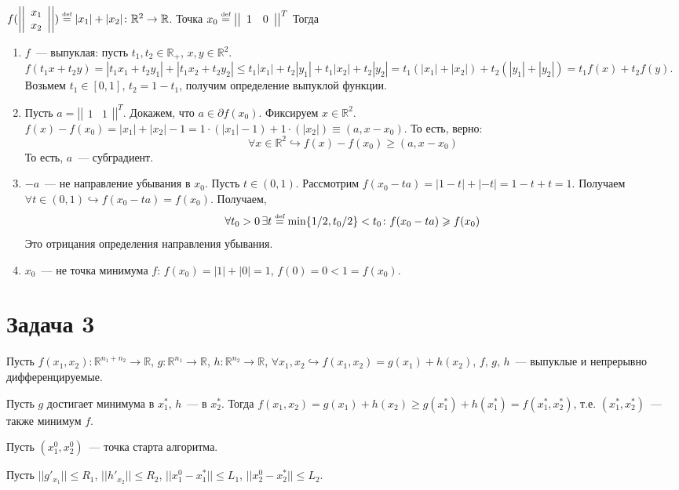 \documentclass[a4paper]{article}
\newcommand{\matrixr}{\right|\right|}
\newcommand{\matrixl}{\left|\left|}
\def\eqdef{\overset{\mbox{\tiny def}}{=}}
\begin{document}
$f(\matrixl
\begin{array}{c}
x_1\\
x_2
\end{array}
\matrixr)\eqdef |x_1|+|x_2|\colon \mathbb{R}^2\to\mathbb{R}$. Точка $x_0\eqdef \matrixl
\begin{array}{cc}
1 & 0
\end{array}
\matrixr^T$ Тогда\begin{enumerate}
\item $f$~--- выпуклая: пусть $t_1,t_2\in\mathbb{R}_+$, $x,y\in\mathbb{R}^2$. $f(t_1x+t_2y)=|t_1x_1+t_2y_1|+|t_1x_2+t_2y_2|\leqslant t_1|x_1|+t_2|y_1|+t_1|x_2|+t_2|y_2|=t_1(|x_1|+|x_2|)+t_2(|y_1|+|y_2|)=t_1f(x)+t_2f(y)$. Возьмем $t_1\in[0,1]$, $t_2=1-t_1$, получим определение выпуклой функции.
\item Пусть $a=\matrixl
\begin{array}{cc}
1 & 1
\end{array}
\matrixr^T$. Докажем, что $a\in\partial f(x_0)$. Фиксируем $x\in\mathbb{R}^2$. $f(x)-f(x_0)=|x_1|+|x_2|-1=1\cdot(|x_1|-1)+1\cdot(|x_2|)\equiv(a, x-x_0)$. То есть, верно:
$$\forall x\in\mathbb{R}^2\hookrightarrow f(x)-f(x_0)\geqslant (a,x-x_0)$$
То есть, $a$~--- субградиент.
\item $-a$~--- не направление убывания в $x_0$. Пусть $t\in(0,1)$. Рассмотрим $f(x_0-ta)=|1-t|+|-t|=1-t+t=1$. Получаем $\forall t\in(0,1)\hookrightarrow f(x_0-ta)=f(x_0)$. Получаем, $$\forall t_0>0\,\exists t\eqdef\min\{1/2,t_0/2\}<t_0\colon f(x_0-ta)\geqslant f(x_0)$$
Это отрицания определения направления убывания.
\item $x_0$~--- не точка минимума $f$: $f(x_0)=|1|+|0|=1$, $f(0)=0<1=f(x_0)$.
\end{enumerate}
\section*{Задача 3}
Пусть $f(x_1,x_2)\colon \mathbb{R}^{n_1+n_2}\to\mathbb{R}$, $g\colon \mathbb{R}^{n_1}\to\mathbb{R}$,  $h\colon \mathbb{R}^{n_2}\to\mathbb{R}$, $\forall x_1,x_2\hookrightarrow f(x_1,x_2)=g(x_1)+h(x_2)$, $f,\,g,\,h$~--- выпуклые и непрерывно дифференцируемые.

Пусть $g$ достигает минимума в $x_1^*$, $h$~--- в $x_2^*$. Тогда $f(x_1,x_2)=g(x_1)+h(x_2)\geqslant g(x_1^*)+h(x_1^*)=f(x_1^*,x_2^*)$, т.е. $(x_1^*,x_2^*)$~--- также минимум $f$.

Пусть $(x_1^0,x_2^0)$~--- точка старта алгоритма.

Пусть $||g'_{x_1}||\leqslant R_1$, $||h'_{x_2}||\leqslant R_2$, $||x_1^0-x_1^*||\leqslant L_1$, $||x_2^0-x_2^*||\leqslant L_2$.
\end{document}

